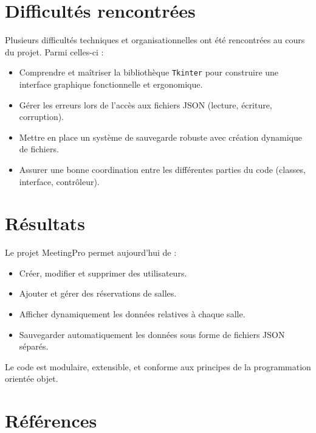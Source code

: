 \documentclass[a4paper,12pt]{article}
\begin{document}
\section{Difficult\'es rencontr\'ees}
Plusieurs difficult\'es techniques et organisationnelles ont \'et\'e rencontr\'ees au cours du projet. Parmi celles-ci :
\begin{itemize}
    \item Comprendre et ma\^itriser la biblioth\`eque \texttt{Tkinter} pour construire une interface graphique fonctionnelle et ergonomique.
    \item G\'erer les erreurs lors de l'acc\`es aux fichiers JSON (lecture, \'ecriture, corruption).
    \item Mettre en place un syst\`eme de sauvegarde robuste avec cr\'eation dynamique de fichiers.
    \item Assurer une bonne coordination entre les diff\'erentes parties du code (classes, interface, contr\^oleur).
\end{itemize}

\section{R\'esultats}
Le projet MeetingPro permet aujourd'hui de :
\begin{itemize}
    \item Cr\'eer, modifier et supprimer des utilisateurs.
    \item Ajouter et g\'erer des r\'eservations de salles.
    \item Afficher dynamiquement les donn\'ees relatives \`a chaque salle.
    \item Sauvegarder automatiquement les donn\'ees sous forme de fichiers JSON s\'epar\'es.
\end{itemize}

Le code est modulaire, extensible, et conforme aux principes de la programmation orient\'ee objet.

\newpage
\section*{R\'ef\'erences}
\nocite{*}
\printbibliography
\end{document}
